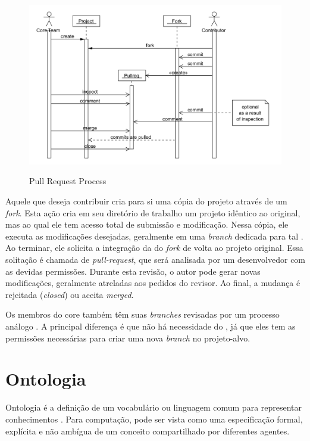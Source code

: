 \documentclass[a4paper,12pt]{monografia}
\theoremstyle{plain}
\theoremstyle{definition}
\theoremstyle{remark}
\begin{document}
   \begin{figure}[!htbp]
    \includegraphics[width=\textwidth]{pull-request-flow}\label{fig:pull-request-flow}
    \caption{Pull Request Process \cite{gousios2014}}
  \end{figure}

  Aquele que deseja contribuir cria para si uma cópia do projeto através de um \textit{fork}. Esta ação cria em seu diretório de trabalho um projeto idêntico ao original, mas ao qual ele tem acesso total de submissão e modificação. Nessa cópia, ele executa as modificações desejadas, geralmente em uma \textit{branch} dedicada para tal \cite{gousios2016}. Ao terminar, ele solicita a integração da  do \textit{fork} de volta ao projeto original. Essa solitação é chamada de \textit{pull-request}, que será analisada por um desenvolvedor com as devidas permissões. Durante esta revisão, o autor pode gerar novas modificações, geralmente atreladas aos pedidos do revisor. Ao final, a mudança é rejeitada (\textit{closed}) ou aceita \textit{merged}.

  Os membros do core também têm suas \textit{branches} revisadas por um processo análogo \cite{6385140,Bosu2014}. A principal diferença é que não há necessidade do , já que eles tem as permissões necessárias para criar uma nova \textit{branch} no projeto-alvo.

\section{Ontologia}

Ontologia é a definição de um vocabulário ou linguagem comum para representar conhecimentos \cite{gruber1995}. Para computação, pode ser vista como uma especificação formal, explícita e não ambígua de um conceito compartilhado por diferentes agentes.
\end{document}
